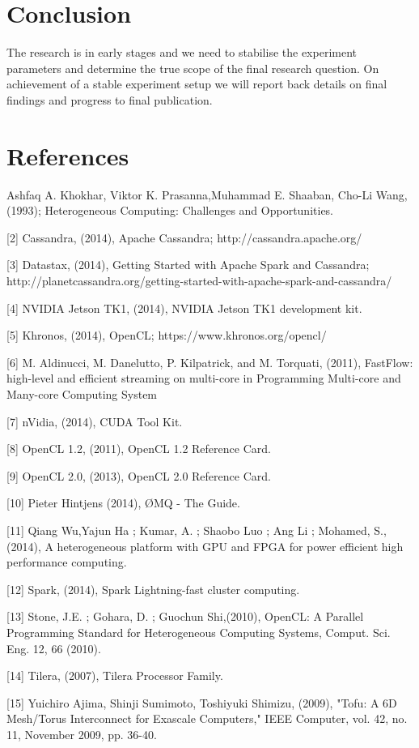 \documentclass{acm_proc_article-sp}
\begin{document}
\section{Conclusion}
The research is in early stages and we need to stabilise the experiment parameters and determine the true scope of the final research question. On achievement of a stable experiment setup we will report back details on final findings and progress to final publication.
\section{References}
\begin{small}
[1] Ashfaq A. Khokhar, Viktor K. Prasanna,Muhammad E. Shaaban, Cho-Li Wang, (1993); Heterogeneous Computing: Challenges and Opportunities.

[2] Cassandra, (2014), Apache Cassandra; http://cassandra.apache.org/ 

[3] Datastax, (2014), Getting Started with Apache Spark and Cassandra; 
http://planetcassandra.org/getting-started-with-apache-spark-and-cassandra/ 

[4] NVIDIA Jetson TK1, (2014), NVIDIA Jetson TK1 development kit.

[5] Khronos, (2014), OpenCL; https://www.khronos.org/opencl/

[6] M. Aldinucci, M. Danelutto, P. Kilpatrick, and M. Torquati, (2011), 
FastFlow: high-level and efficient streaming on multi-core in Programming Multi-core and Many-core Computing System

[7] nVidia, (2014), CUDA Tool Kit.

[8] OpenCL 1.2, (2011), OpenCL 1.2 Reference Card.

[9] OpenCL 2.0, (2013), OpenCL 2.0 Reference Card.

[10] Pieter Hintjens (2014), ØMQ - The Guide.

[11] Qiang Wu,Yajun Ha ; Kumar, A. ; Shaobo Luo ; Ang Li ; Mohamed, S., (2014), A heterogeneous platform with GPU and FPGA for power efficient high performance computing.

[12] Spark, (2014), Spark Lightning-fast cluster computing.

[13] Stone, J.E. ; Gohara, D. ; Guochun Shi,(2010), OpenCL: A Parallel Programming Standard for Heterogeneous Computing Systems, Comput. Sci. Eng. 12, 66 (2010).

[14] Tilera, (2007), Tilera Processor Family.

[15] Yuichiro Ajima, Shinji Sumimoto, Toshiyuki Shimizu, (2009), "Tofu: A 6D Mesh/Torus Interconnect for Exascale Computers," IEEE Computer, vol. 42, no. 11, November 2009, pp. 36-40.
\end{small}
\end{document}
